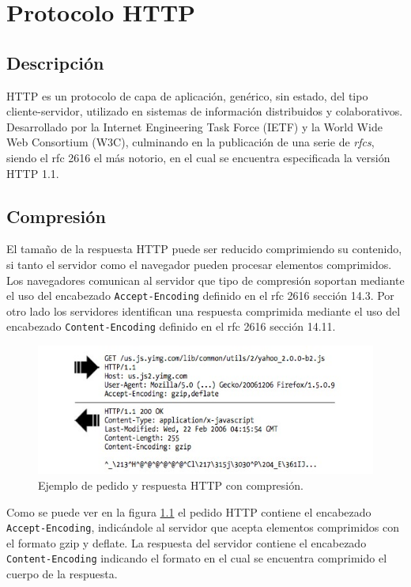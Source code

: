\documentclass[a4paper,12pt]{report}
\begin{document}
\chapter{Protocolo HTTP}

\section{Descripción}
HTTP es un protocolo de capa de aplicación, genérico, sin estado, del tipo cliente-servidor, utilizado en sistemas de información distribuidos y colaborativos.
Desarrollado por la Internet Engineering Task Force (IETF) y la World Wide Web Consortium (W3C), culminando en la publicación de una serie de \emph{rfcs},
siendo el rfc 2616 \cite{rfc2616} el más notorio, en el cual se encuentra especificada la versión HTTP 1.1.

\section{Compresión}

El tamaño de la respuesta HTTP puede ser reducido comprimiendo su contenido, si tanto el servidor como el navegador pueden procesar elementos comprimidos.
Los navegadores comunican al servidor que tipo de compresión soportan mediante el uso del encabezado \texttt{Accept-Encoding} definido en el rfc 2616 \cite{rfc2616} sección 14.3.
Por otro lado los servidores identifican una respuesta comprimida mediante el uso del encabezado \texttt{Content-Encoding} definido en el rfc 2616 \cite{rfc2616} sección 14.11.

\begin{figure}[h]
\centering
\includegraphics[width=1\textwidth]{figuras/apendice/compression.jpg}
  \caption{Ejemplo de pedido y respuesta HTTP con compresión.}
    \label{fig.compresion}
\end{figure}

Como se puede ver en la figura \ref{fig.compresion} el pedido HTTP contiene el encabezado \texttt{Accept-Encoding}, indicándole al servidor que acepta elementos comprimidos
con el formato gzip y deflate. La respuesta del servidor contiene el encabezado \texttt{Content-Encoding} indicando el formato en el cual se encuentra comprimido
el cuerpo de la respuesta.
\end{document}
